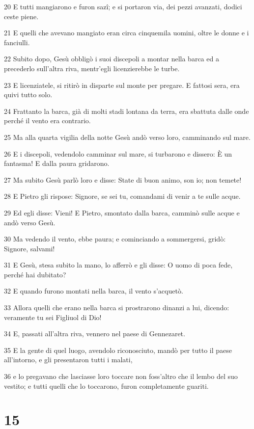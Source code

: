 \par 20 E tutti mangiarono e furon sazî; e si portaron via, dei pezzi avanzati, dodici ceste piene.
\par 21 E quelli che avevano mangiato eran circa cinquemila uomini, oltre le donne e i fanciulli.
\par 22 Subito dopo, Gesù obbligò i suoi discepoli a montar nella barca ed a precederlo sull'altra riva, mentr'egli licenzierebbe le turbe.
\par 23 E licenziatele, si ritirò in disparte sul monte per pregare. E fattosi sera, era quivi tutto solo.
\par 24 Frattanto la barca, già di molti stadi lontana da terra, era sbattuta dalle onde perché il vento era contrario.
\par 25 Ma alla quarta vigilia della notte Gesù andò verso loro, camminando sul mare.
\par 26 E i discepoli, vedendolo camminar sul mare, si turbarono e dissero: È un fantasma! E dalla paura gridarono.
\par 27 Ma subito Gesù parlò loro e disse: State di buon animo, son io; non temete!
\par 28 E Pietro gli rispose: Signore, se sei tu, comandami di venir a te sulle acque.
\par 29 Ed egli disse: Vieni! E Pietro, smontato dalla barca, camminò sulle acque e andò verso Gesù.
\par 30 Ma vedendo il vento, ebbe paura; e cominciando a sommergersi, gridò: Signore, salvami!
\par 31 E Gesù, stesa subito la mano, lo afferrò e gli disse: O uomo di poca fede, perché hai dubitato?
\par 32 E quando furono montati nella barca, il vento s'acquetò.
\par 33 Allora quelli che erano nella barca si prostrarono dinanzi a lui, dicendo: veramente tu sei Figliuol di Dio!
\par 34 E, passati all'altra riva, vennero nel paese di Gennezaret.
\par 35 E la gente di quel luogo, avendolo riconosciuto, mandò per tutto il paese all'intorno, e gli presentaron tutti i malati,
\par 36 e lo pregavano che lasciasse loro toccare non foss'altro che il lembo del suo vestito; e tutti quelli che lo toccarono, furon completamente guariti.

\chapter{15}

